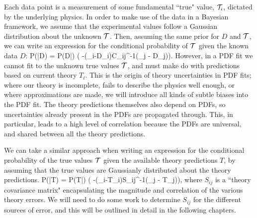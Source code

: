 Each data point is a measurement of some fundamental ``true" value, $\mathcal{T}_i$, dictated by the underlying physics. In order to make use of the data in a Bayesian framework, we assume that the experimental values follow a Gaussian distribution about the unknown $\mathcal{T}$. Then, assuming the same prior for $D$ and $\mathcal{T}$, we can write an expression for the conditional probability of $\mathcal{T}$ given the known data $D$:
\beq
\label{eqn:gaussexp}
P(\truev|D) = P(D|\truev) \propto \exp\bigg( -(\truev_i-D_i)C_{ij}^{-1}(\truev_j - D_j)\bigg).
\eeq
However, in a PDF fit we cannot fit to the unknown true values $\mathcal{T}$, and must make do with predictions based on current theory $T_i$. This is the origin of theory uncertainties in PDF fits; where our theory is incomplete, fails to describe the physics well enough, or where approximations are made, we will introduce all kinds of subtle biases into the PDF fit. The theory predictions themselves also depend on PDFs, so uncertainties already present in the PDFs are propagated through. This, in particular, leads to a high level of correlation because the PDFs are universal, and shared between all the theory predictions. 

We can take a similar approach when writing an expression for the conditional probability of the true values $\mathcal{T}$ given the available theory predictions $T$, by assuming that the true values are Gaussianly distributed about the theory predictions.
\beq
\label{eqn:gausstheory}
P(\truev|T) = P(T|\truev) \propto \exp\bigg( -(\truev_i-T_i)S_{ij}^{-1}(\truev_j - T_j)\bigg),
\eeq
where $S_{ij}$ is a ``theory covariance matrix" encapsulating the magnitude and correlation of the various theory errors. We will need to do some work to determine $S_{ij}$ for the different sources of error, and this will be outlined in detail in the following chapters. 

